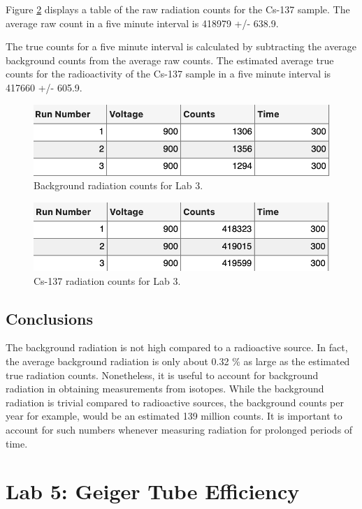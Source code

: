 \documentclass[reprint,amsmath,amssymb,aps,prl]{revtex4-2}
\begin{document}
Figure \ref{fig:lab3_cs137_table} displays a table of the raw radiation counts for the Cs-137 sample. The average raw count in a five minute interval is 418979 +/- 638.9. 

The true counts for a five minute interval is calculated by subtracting the average background counts from the average raw counts. The estimated average true counts for the radioactivity of the Cs-137 sample in a five minute interval is 417660 +/- 605.9. 

\begin{figure}
    \centering
    \includegraphics[width = \columnwidth]{lab3_background_table.png}
    \caption{Background radiation counts for Lab 3.}
    \label{fig:lab3_background_table}
\end{figure}
\begin{figure}
    \centering
    \includegraphics[width = \columnwidth]{lab3_cs137_table.png}
    \caption{Cs-137 radiation counts for Lab 3.}
    \label{fig:lab3_cs137_table}
\end{figure}

\subsection{Conclusions} 
The background radiation is not high compared to a radioactive source. In fact, the average background radiation is only about 0.32 $\%$  as large as the estimated true radiation counts. Nonetheless, it is useful to account for background radiation in obtaining measurements from isotopes. While the background radiation is trivial compared to radioactive sources, the background counts per year for example, would be an estimated 139 million counts. It is important to account for such numbers whenever measuring radiation for prolonged periods of time. 


\section{Lab 5: Geiger Tube Efficiency}
\end{document}
